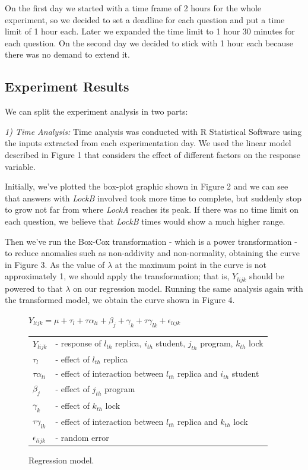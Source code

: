 On the first day we started with a time frame of 2 hours for the whole experiment, so we decided to set a deadline for each question and put a time limit of 1 hour each. Later we expanded the time limit to 1 hour 30 minutes for each question. On the second day we decided to stick with 1 hour each because there was no demand to extend it.

\subsection{Experiment Results}

We can split the experiment analysis in two parts:

\emph{1) Time Analysis:} Time analysis was conducted with R Statistical Software using the inputs extracted from each experimentation day. We used the linear model described in Figure 1 that considers the effect of different factors on the response variable.

Initially, we've plotted the box-plot graphic shown in Figure 2 and we can see that answers with \emph{LockB} involved took more time to complete, but suddenly stop to grow not far from where \emph{LockA} reaches its peak. If there was no time limit on each question, we believe that \emph{LockB} times would show a much higher range.

Then we've run the Box-Cox transformation - which is a power transformation - to reduce anomalies such as non-addivity and non-normality, obtaining the curve in Figure 3. As the value of $\lambda$ at the maximum point in the curve is not approximately 1, we should apply the transformation; that is, $Y_{lijk}$ should be powered to that $\lambda$ on our regression model. Running the same analysis again with the transformed model, we obtain the curve shown in Figure 4.

\begin{figure}
\begin{center}
$Y_{lijk} = \mu + \tau_{l} + \tau\alpha_{li} + \beta_{j} + \gamma_{k} + \tau\gamma_{lk} + \epsilon_{lijk}$\\
\vspace{4mm}
\begin{tabular}{ll}
$Y_{lijk}$ & - response of $l_{th}$ replica, $i_{th}$ student, $j_{th}$ program, $k_{th}$ lock \\
$\tau_{l}$ & - effect of $l_{th}$ replica \\
$\tau\alpha_{li}$ & - effect of interaction between $l_{th}$ replica and $i_{th}$ student \\
$\beta_{j}$ & - effect of $j_{th}$ program \\
$\gamma_{k}$ & - effect of $k_{th}$ lock \\
$\tau\gamma_{lk}$ & - effect of interaction between $l_{th}$ replica and $k_{th}$ lock \\
$\epsilon_{lijk}$ & - random error \\
\end{tabular}
\caption{Regression model.}
\end{center}
\end{figure}

